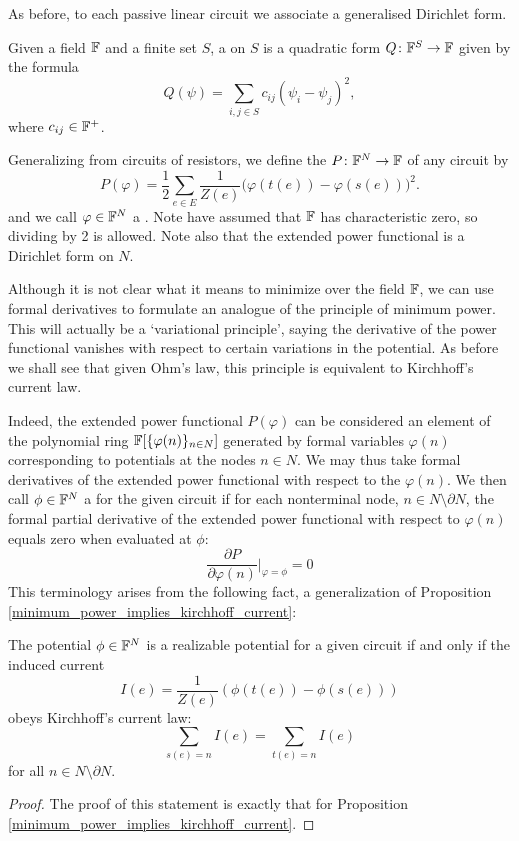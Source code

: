 As before, to each passive linear circuit we associate a generalised Dirichlet
form.

\begin{definition} Given a field ${\mathbb F}$ and
  a finite set $S$, a  on $S$ is a quadratic form   
  $Q{\colon} {\mathbb F}^S \to {\mathbb F}$ given by the formula 
  \[ 
    Q(\psi) = \sum_{i,j \in S} c_{ij} (\psi_i - \psi_j)^2,
  \]
  where $c_{i j} \in {\mathbb F}^+$.  
\end{definition}

Generalizing from circuits of resistors, we define the
 $P{\colon} {\mathbb F}^N \to {\mathbb F}$ of any circuit by
\[
  P(\varphi) = \frac{1}{2} \sum_{e \in E}
  \frac1{Z(e)}\big(\varphi(t(e))-\varphi(s(e))\big)^2.
\]
and we call $\varphi \in {\mathbb F}^N$ a . Note have assumed that
${\mathbb F}$ has characteristic zero, so dividing by 2 is allowed.  Note also that the
extended power functional is a Dirichlet form on $N$.

Although it is not clear what it means to minimize over the field ${\mathbb F}$, we can
use formal derivatives to formulate an analogue of the principle of minimum 
power.   This will actually be a `variational principle', saying the derivative of
the power functional vanishes with respect to certain variations in the potential.
As before we shall see that given Ohm's law, this principle is equivalent to
Kirchhoff's current law.

Indeed, the extended power functional $P(\varphi)$ can be considered an element
of the polynomial ring ${\mathbb F}[\{\varphi(n)\}_{n \in N}]$ generated by formal
variables $\varphi(n)$ corresponding to potentials at the nodes $n \in N$. We
may thus take formal derivatives of the extended power functional with respect
to the $\varphi(n)$.  We then call $\phi \in {\mathbb F}^N$ a  for the given circuit if for each nonterminal node, $n \in N\setminus
\partial N$, the formal partial derivative of the extended power functional with
respect to $\varphi(n)$ equals zero when evaluated at $\phi$:
\[
  \frac{\partial P}{\partial \varphi(n)}\bigg\vert_{\varphi = \phi} = 0
\]
This terminology arises from the following fact, a generalization of Proposition
\ref{minimum_power_implies_kirchhoff_current}:

\begin{theorem} \label{thm:realizablepotentials}
The potential $\phi \in {\mathbb F}^N$ is a realizable potential for a given
circuit if and only if the induced current 
\[  I(e) = \frac1{Z(e)}(\phi(t(e))-\phi(s(e))) \]
obeys Kirchhoff's current law:
\[ 
\sum_{s(e) = n} I(e) = \sum_{t(e) = n} I(e)
\]  
for all $n \in N\setminus \partial N$.
\end{theorem}
\begin{proof}
The proof of this statement is exactly that for Proposition
\ref{minimum_power_implies_kirchhoff_current}. 
\end{proof}

